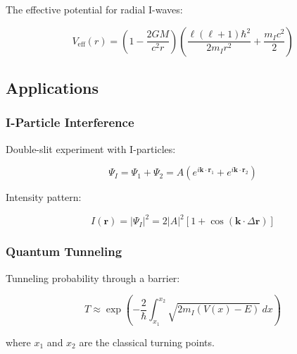 The effective potential for radial I-waves:

\begin{equation}
\label{eq:effective_potential_schwarzschild}
V_{\text{eff}}(r) = \left(1-\frac{2GM}{c^2r}\right)\left(\frac{\ell(\ell+1)\hbar^2}{2m_Ir^2} + \frac{m_Ic^2}{2}\right)
\end{equation}

\subsection{Applications}

\subsubsection{I-Particle Interference}

Double-slit experiment with I-particles:

\begin{equation}
\label{eq:double_slit}
\Psi_I = \Psi_1 + \Psi_2 = A(e^{i\mathbf{k}\cdot\mathbf{r}_1} + e^{i\mathbf{k}\cdot\mathbf{r}_2})
\end{equation}

Intensity pattern:

\begin{equation}
\label{eq:interference_pattern}
I(\mathbf{r}) = |\Psi_I|^2 = 2|A|^2[1 + \cos(\mathbf{k}\cdot\Delta\mathbf{r})]
\end{equation}

\subsubsection{Quantum Tunneling}

Tunneling probability through a barrier:

\begin{equation}
\label{eq:tunneling_probability}
T \approx \exp\left(-\frac{2}{\hbar}\int_{x_1}^{x_2}\sqrt{2m_I(V(x)-E)}\,dx\right)
\end{equation}

where $x_1$ and $x_2$ are the classical turning points.
